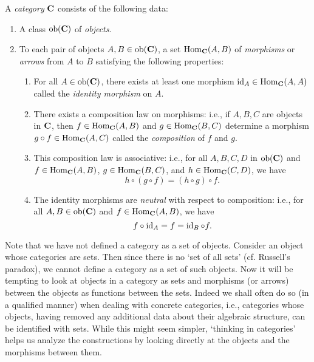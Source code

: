
\begin{definition}[Category]
    A \emph{category} \(\mathbf{C}\) consists of the following data:
    \begin{enumerate}[label=(\alph*), itemsep=0pt]
        \item A class \(\operatorname{ob}(\mathbf{\mathbf{C}})\) of \emph{objects}.
        \item To each pair of objects \(A, B \in \operatorname{ob}(\mathbf{\mathbf{C}})\), a set
        \(\operatorname{Hom}_{\mathbf{C}}(A, B)\) of \emph{morphisms} or \emph{arrows} from
        \(A\) to \(B\) satisfying the following properties:
        \begin{enumerate}[label=(\roman*), itemsep=0pt]
            \item For all \(A \in \operatorname{ob}(\mathbf{\mathbf{C}})\), there exists at least one
            morphism \(\operatorname{id}_A \in \operatorname{Hom}_{\mathbf{C}}(A, A)\) called the
            \emph{identity morphism} on \(A\).
            
            \item There exists a composition law on morphisms: i.e., if \(A, B,
            C\) are objects in \(\mathbf{C}\), then \(f \in \operatorname{Hom}_{\mathbf{C}}(A,
            B)\) and \(g \in \operatorname{Hom}_{\mathbf{C}}(B, C)\) determine a morphism \(g
            \circ f \in \operatorname{Hom}_{\mathbf{C}}(A, C)\) called the \emph{composition} of
            \(f\) and \(g\). 
            
            \item This composition law is associative: i.e., for all \(A, B, C,
            D\) in \(\operatorname{ob}(\mathbf{\mathbf{C}})\) and \(f \in \operatorname{Hom}_{\mathbf{C}}(A, B)\), \(g
            \in \operatorname{Hom}_{\mathbf{C}}(B, C)\), and \(h \in \operatorname{Hom}_{\mathbf{C}}(C, D)\), we
            have
            \[
                h \circ (g \circ f) = (h \circ g) \circ f.
            \]

            \item The identity morphisms are \emph{neutral} with respect to
            composition: i.e., for all \(A, B \in \operatorname{ob}(\mathbf{\mathbf{C}})\) and \(f \in
            \operatorname{Hom}_{\mathbf{C}}(A, B)\), we have
            \[
                f \circ \operatorname{id}_A = f = \operatorname{id}_B \circ f.
            \]
        \end{enumerate}
    \end{enumerate}
\end{definition}

Note that we have not defined a category as a set of objects. Consider an object
whose categories are sets. Then since there is no `set of all sets' (cf.
Russell's paradox), we cannot define a category as a set of such objects. Now it
will be tempting to look at objects in a category as sets and morphisms (or
arrows) between the objects as functions between the sets. Indeed we shall often
do so (in a qualified manner) when dealing with concrete categories, i.e.,
categories whose objects, having removed any additional data about their
algebraic structure, can be identified with sets. While this might seem simpler,
`thinking in categories' helps us analyze the constructions by looking directly
at the objects and the morphisms between them.

